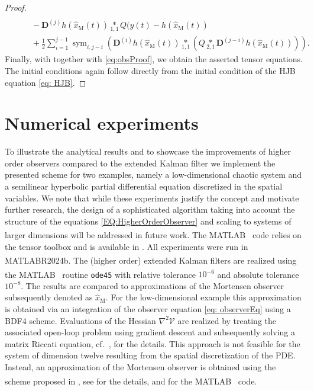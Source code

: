 \documentclass[11pt,reqno]{amsart}
\numberwithin{equation}{section}
\theoremstyle{plain}
\DeclareMathOperator{\Sym}{sym}
\newcommand{\tenp}[2]{\underset{#1,#2}{*}}
\newcommand{\TenDeriv}[1]{\mathbf{D}^{(#1)}}
\newcommand{\Matlab}{MATLAB\textsuperscript{\textregistered}}
\begin{document}
\begin{proof}
\begin{align*}
    \\
    &\qquad - \TenDeriv{j} h(\widehat{x}_{\mathrm{M}}(t)) \tenp{1}{1} Q ( y(t) - h(\widehat{x}_{\mathrm{M}}(t))
    \\
    & \qquad + \frac{1}{2} \sum_{i=1}^{j-1} \Sym_{i,j-i} \left(\TenDeriv{i} h(\widehat{x}_{\mathrm{M}}(t)) \tenp{1}{1} \left(Q \tenp{2}{1} \TenDeriv{j-i} h(\widehat{x}_{\mathrm{M}}(t))\right) \right).
\end{align*}
%
Finally, with  together with \eqref{eq:obsProof}, we obtain the asserted tensor equations.
The initial conditions again follow directly from the initial condition of the HJB equation \eqref{eq: HJB}.
\end{proof}

%
\section{Numerical experiments}\label{sec:Num}
%
To illustrate the analytical results and to showcase the improvements of higher order observers compared to the extended Kalman filter we implement the presented scheme for two examples, namely a low-dimensional chaotic system and a semilinear hyperbolic partial differential equation discretized in the spatial variables. We note that while these experiments justify the concept and motivate further research, the design of a sophisticated algorithm taking into account the structure of the equations \eqref{EQ:HigherOrderObserver} and scaling to systems of larger dimensions will be addressed in future work. 
The \Matlab~ code relies on the tensor toolbox \cite{BaKo25} and is available in \cite{BrRaSc26}. 
All experiments were run in \Matlab R2024b. The (higher order) extended Kalman filters are realized using the \Matlab~ routine \texttt{ode45} with relative tolerance $10^{-6}$ and absolute tolerance $10^{-8}$.
The results are compared to approximations of the Mortensen observer subsequently denoted as $\widehat{x}_\mathrm{M}$. For the low-dimensional example this approximation is obtained via an integration of the observer equation \eqref{eq: observerEq} using a BDF4 scheme. Evaluations of the Hessian $\nabla^2 \mathcal{V}$ are realized by treating the associated open-loop problem using gradient descent and subsequently solving a matrix Riccati equation, cf.~\cite[Subs.~3.1, Sec.~5]{BreKuSc23}, for the details.
This approach is not feasible for the system of dimension twelve resulting from the spatial discretization of the PDE. Instead, an approximation of the Mortensen observer is obtained using the scheme proposed in 
\cite{BreKuSc23}, see  for the details, and \cite{SchB24a} for the \Matlab~ code.
\end{document}
